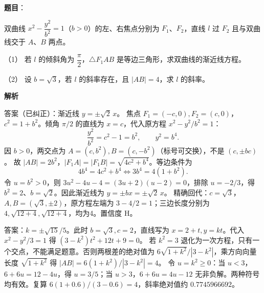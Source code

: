 \begin{answer}

\textbf{题目}：

双曲线 \(x^2-\dfrac{y^2}{b^2}=1\)（\(b>0\)）的左、右焦点分别为 \(F_1\)、\(F_2\)，直线 \(l\) 过 \(F_2\) 且与双曲线交于 \(A\)、\(B\) 两点。

（1） 若 \(l\) 的倾斜角为 \(\dfrac\pi2\)，\(\triangle F_1AB\) 是等边三角形，求双曲线的渐近线方程。

（2） 设 \(b=\sqrt3\)，若 \(l\) 的斜率存在，且 \(|AB|=4\)，求 \(l\) 的斜率。


\textbf{解析}


答案（已纠正）：渐近线 \(y=\pm\sqrt2\,x\)。
焦点 \(F_1=(-c,0),F_2=(c,0)\)，\(c^2=1+b^2\)。倾角 \(\pi/2\) 的直线为 \(x=c\)，代入原方程 \(x^2-y^2/b^2=1\)：
\nopagebreak[4]
\[
\frac{y^2}{b^2}=c^2-1=b^2,\qquad y^2=b^4.
\]
因 \(b>0\)，两交点为 \(A=(c,b^2),B=(c,-b^2)\)（标号可交换），不是 \((c,\pm bc)\)。
故 \(|AB|=2b^2\)，\(|F_1A|=|F_1B|=\sqrt{4c^2+b^4}\)。等边条件为
\nopagebreak[4]
\[
4b^4=4c^2+b^4\iff3b^4=4(1+b^2).
\]
令 \(u=b^2>0\)，则 \(3u^2-4u-4=(3u+2)(u-2)=0\)，排除 \(u=-2/3\)，得 \(b^2=2\)、\(b=\sqrt2\)。因此渐近线为 \(y=\pm bx=\pm\sqrt2\,x\)。
精确回代：\(c=\sqrt3\)，\(A,B=(\sqrt3,\pm2)\)，原方程左端为 \(3-4/2=1\)；三边长度分别为 \(4,\sqrt{12+4},\sqrt{12+4}\)，均为4。置信度 H。


答案：\(k=\pm\sqrt{15}/5\)。此时 \(b=\sqrt3,c=2\)，直线写为 \(x=2+t,y=kt\)。代入 \(x^2-y^2/3=1\) 得
\((3-k^2)t^2+12t+9=0\)。
若 \(k^2=3\) 退化为一次方程，只有一个交点，不能满足题意。否则两根差的绝对值为 \(6\sqrt{1+k^2}/|3-k^2|\)，乘方向向量长度 \(\sqrt{1+k^2}\) 得
\(|AB|=6(1+k^2)/|3-k^2|=4\)。
令 \(u=k^2\ge0\)：当 \(u<3\)，\(6+6u=12-4u\)，得 \(u=3/5\)；当 \(u>3\)，\(6+6u=4u-12\) 无非负解。两种符号均有效。复算 \(6(1+0.6)/(3-0.6)=4\)，斜率绝对值约 \(0.7745966692\)。



\end{answer}
